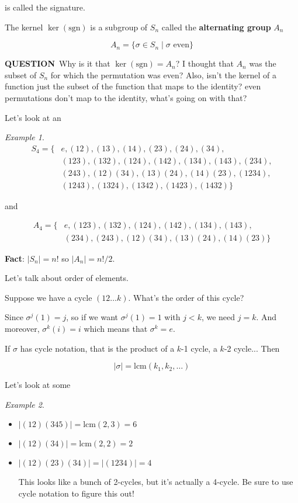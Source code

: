 \documentclass[12pt]{article}
\def\sgn{\text{sgn}}
\def\lcm{\text{lcm}}
\def\sgn{\text{sgn}}
\def\QUESTION{\color{red}\textbf{QUESTION}\color{black}\,}
\theoremstyle{remark}
\theoremstyle{remark}
\theoremstyle{remark}
\newtheorem{example}{Example}
\theoremstyle{remark}
\theoremstyle{remark}
\begin{document}
is called the signature.

The kernel $\ker(\sgn)$ is a subgroup of $S_n$ called the {\bf alternating
group} $A_n$

\[
  A_n = \{\sigma \in S_n \mid \sigma \text{ even}\}
\]

\QUESTION{} Why is it that $\ker(\sgn) = A_n$? I thought that $A_n$ was the subset
of $S_n$ for which the permutation was even? Also, isn't the kernel of a
function just the subset of the function that maps to the identity? even
permutations don't map to the identity, what's going on with that?

Let's look at an

\begin{example}
  \begin{align*}
    S_4 = \{ &e, (12), (13), (14), (23), (24), (34), \\
             &(123), (132), (124), (142), (134), (143), (234), \\
             &(243), (12)(34), (13)(24), (14)(23), (1234), \\
             &(1243), (1324), (1342), (1423), (1432) \}
  \end{align*}

  and

  \begin{align*}
    A_4 = \{ &e, (123), (132), (124), (142), (134), (143), \\
             &(234), (243), (12)(34), (13)(24), (14)(23) \}
  \end{align*}
\end{example}

{\bf Fact}: $|S_n| = n!$ so $|A_n| = n! / 2$.

Let's talk about order of elements.

Suppose we have a cycle $(12 \dots k)$. What's the order of this cycle?

Since $\sigma^j(1) = j$, so if we want $\sigma^j(1) = 1$ with $j < k$, we need
$j = k$. And moreover, $\sigma^k(i) = i$ which means that $\sigma^k = e$.

If $\sigma$ has cycle notation, that is the product of a $k$-1 cycle, a $k$-2
cycle... Then

\[
  |\sigma| = \lcm(k_1, k_2, \dots)
\]

Let's look at some

\begin{example}
  \begin{itemize}
    \item $|(12)(345)| = \lcm(2, 3) = 6$
    \item $|(12)(34)| = \lcm(2, 2) = 2$
    \item $|(12)(23)(34)| = |(1234)| = 4$

      This looks like a bunch of 2-cycles, but it's actually a 4-cycle. Be sure
      to use cycle notation to figure this out!
  \end{itemize}
\end{example}
\end{document}
